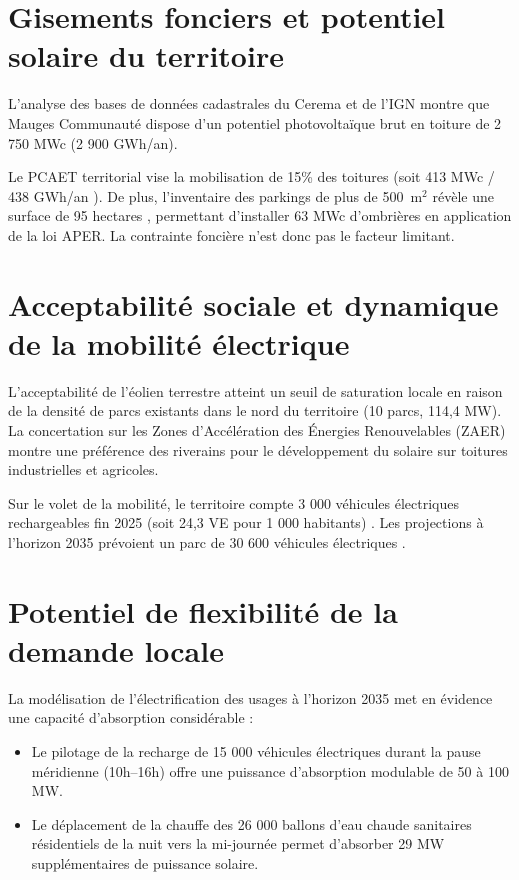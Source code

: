 \documentclass[12pt, a4paper]{report}
\begin{document}
\section{Gisements fonciers et potentiel solaire du territoire}

L'analyse des bases de données cadastrales du Cerema et de l'IGN \cite{cerema_pv} montre que Mauges Communauté dispose d'un potentiel photovoltaïque brut en toiture de 2 750 MWc (2 900 GWh/an).

Le PCAET territorial vise la mobilisation de 15\% des toitures (soit 413 MWc / 438 GWh/an \cite{pcaet_mauges}). De plus, l'inventaire des parkings de plus de 500~$\text{m}^2$ révèle une surface de 95 hectares \cite{cerema_pv}, permettant d'installer 63 MWc d'ombrières en application de la loi APER. La contrainte foncière n'est donc pas le facteur limitant.

\section{Acceptabilité sociale et dynamique de la mobilité électrique}

L'acceptabilité de l'éolien terrestre atteint un seuil de saturation locale en raison de la densité de parcs existants dans le nord du territoire (10 parcs, 114,4 MW). La concertation sur les Zones d'Accélération des Énergies Renouvelables (ZAER) montre une préférence des riverains pour le développement du solaire sur toitures industrielles et agricoles.

Sur le volet de la mobilité, le territoire compte 3 000 véhicules électriques rechargeables fin 2025 (soit 24,3 VE pour 1 000 habitants) \cite{ore_voitures}. Les projections à l'horizon 2035 prévoient un parc de 30 600 véhicules électriques \cite{insee_rp}.

\section{Potentiel de flexibilité de la demande locale}

La modélisation de l'électrification des usages à l'horizon 2035 met en évidence une capacité d'absorption considérable :
\begin{itemize}
  \item Le pilotage de la recharge de 15 000 véhicules électriques durant la pause méridienne (10h--16h) offre une puissance d'absorption modulable de 50 à 100 MW.
  \item Le déplacement de la chauffe des 26 000 ballons d'eau chaude sanitaires résidentiels de la nuit vers la mi-journée permet d'absorber 29 MW supplémentaires de puissance solaire.
\end{itemize}
\end{document}
